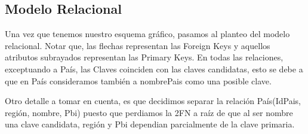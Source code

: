 \documentclass[10pt,a4paper]{article}
\begin{document}
\newpage

\subsection{Modelo Relacional} \vspace{0.2cm}

Una vez que tenemos nuestro esquema gráfico, pasamos al planteo del modelo relacional. Notar que, las flechas representan las Foreign Keys y aquellos atributos 
subrayados representan las Primary Keys. En todas las relaciones, exceptuando a País, las Claves coinciden con las claves candidatas, esto se debe a que en País consideramos también a 
nombrePais como una posible clave. \par
Otro detalle a tomar en cuenta, es que decidimos separar la relación País(IdPais, región, nombre, Pbi) puesto que perdiamos la 2FN a raíz de que 
al ser nombre una clave candidata, región y Pbi dependian parcialmente de la clave primaria. \vspace{0.4cm}

\newbox\ubox
\end{document}
